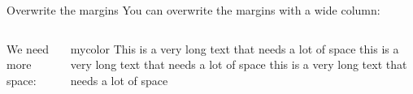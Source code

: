 \documentclass[aspectratio=169,t]{beamer}
\begin{document}
\begin{frame}{Overwrite the margins}
  You can overwrite the margins with a wide column:
\begin{columns}
    We need more space:
  \begin{beamercolorbox}[wd=\textwidth, dp=0.7\textheight, colsep*=4pt]{mycolor}
    This is a very long text that needs a lot of space this is a very long text that needs a lot of space this is a very long text that needs a lot of space
  \end{beamercolorbox}
\end{columns}
\end{frame}
\end{document}

